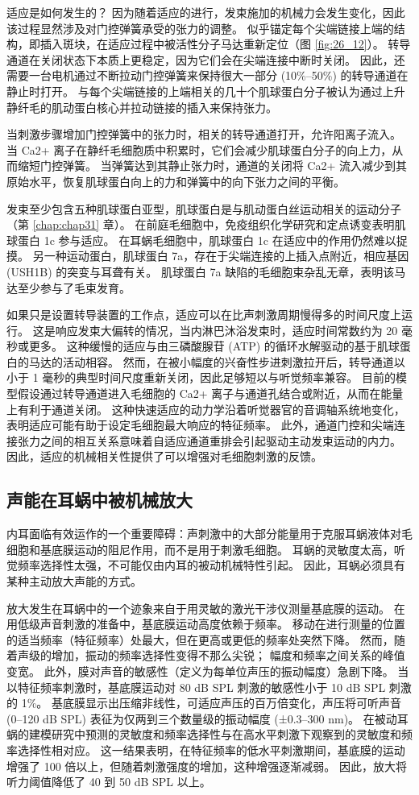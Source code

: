 适应是如何发生的？ 因为随着适应的进行，发束施加的机械力会发生变化，因此该过程显然涉及对门控弹簧承受的张力的调整。 似乎锚定每个尖端链接上端的结构，即插入斑块，在适应过程中被活性分子马达重新定位（图 \ref{fig:26_12}）。 转导通道在关闭状态下本质上更稳定，因为它们会在尖端连接中断时关闭。 因此，还需要一台电机通过不断拉动门控弹簧来保持很大一部分 (10\%–50\%) 的转导通道在静止时打开。 与每个尖端链接的上端相关的几十个肌球蛋白分子被认为通过上升静纤毛的肌动蛋白核心并拉动链接的插入来保持张力。

当刺激步骤增加门控弹簧中的张力时，相关的转导通道打开，允许阳离子流入。 当 Ca2+ 离子在静纤毛细胞质中积累时，它们会减少肌球蛋白分子的向上力，从而缩短门控弹簧。 当弹簧达到其静止张力时，通道的关闭将 Ca2+ 流入减少到其原始水平，恢复肌球蛋白向上的力和弹簧中的向下张力之间的平衡。

发束至少包含五种肌球蛋白亚型，肌球蛋白是与肌动蛋白丝运动相关的运动分子（第 \ref{chap:chap31} 章）。 在前庭毛细胞中，免疫组织化学研究和定点诱变表明肌球蛋白 1c 参与适应。 在耳蜗毛细胞中，肌球蛋白 1c 在适应中的作用仍然难以捉摸。 另一种运动蛋白，肌球蛋白 7a，存在于尖端连接的上插入点附近，相应基因 (USH1B) 的突变与耳聋有关。 肌球蛋白 7a 缺陷的毛细胞束杂乱无章，表明该马达至少参与了毛束发育。

如果只是设置转导装置的工作点，适应可以在比声刺激周期慢得多的时间尺度上运行。 这是响应发束大偏转的情况，当内淋巴沐浴发束时，适应时间常数约为 20 毫秒或更多。 这种缓慢的适应与由三磷酸腺苷 (ATP) 的循环水解驱动的基于肌球蛋白的马达的活动相容。 然而，在被小幅度的兴奋性步进刺激拉开后，转导通道以小于 1 毫秒的典型时间尺度重新关闭，因此足够短以与听觉频率兼容。 目前的模型假设通过转导通道进入毛细胞的 Ca2+ 离子与通道孔结合或附近，从而在能量上有利于通道关闭。 这种快速适应的动力学沿着听觉器官的音调轴系统地变化，表明适应可能有助于设定毛细胞最大响应的特征频率。 此外，通道门控和尖端连接张力之间的相互关系意味着自适应通道重排会引起驱动主动发束运动的内力。 因此，适应的机械相关性提供了可以增强对毛细胞刺激的反馈。

\subsection{声能在耳蜗中被机械放大}
内耳面临有效运作的一个重要障碍：声刺激中的大部分能量用于克服耳蜗液体对毛细胞和基底膜运动的阻尼作用，而不是用于刺激毛细胞。 耳蜗的灵敏度太高，听觉频率选择性太强，不可能仅由内耳的被动机械特性引起。 因此，耳蜗必须具有某种主动放大声能的方式。

放大发生在耳蜗中的一个迹象来自于用灵敏的激光干涉仪测量基底膜的运动。 在用低级声音刺激的准备中，基底膜运动高度依赖于频率。 移动在进行测量的位置的适当频率（特征频率）处最大，但在更高或更低的频率处突然下降。 然而，随着声级的增加，振动的频率选择性变得不那么尖锐； 幅度和频率之间关系的峰值变宽。 此外，膜对声音的敏感性（定义为每单位声压的振动幅度）急剧下降。 当以特征频率刺激时，基底膜运动对 80 dB SPL 刺激的敏感性小于 10 dB SPL 刺激的 1\%。 基底膜显示出压缩非线性，可适应声压的百万倍变化，声压将可听声音 (0–120 dB SPL) 表征为仅两到三个数量级的振动幅度 (±0.3–300 nm)。 在被动耳蜗的建模研究中预测的灵敏度和频率选择性与在高水平刺激下观察到的灵敏度和频率选择性相对应。 这一结果表明，在特征频率的低水平刺激期间，基底膜的运动增强了 100 倍以上，但随着刺激强度的增加，这种增强逐渐减弱。 因此，放大将听力阈值降低了 40 到 50 dB SPL 以上。


